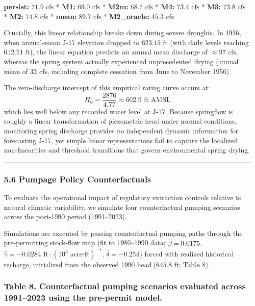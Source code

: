 \documentclass[11pt]{article}
\begin{document}
\textbf{persist:} \(71.9\text{ cfs}\) * \textbf{M1:} \(69.0\text{ cfs}\)
* \textbf{M2m:} \(68.7\text{ cfs}\) * \textbf{M4:} \(73.4\text{ cfs}\) *
\textbf{M3:} \(73.8\text{ cfs}\) * \textbf{M2:} \(74.8\text{ cfs}\) *
\textbf{mean:} \(89.7\text{ cfs}\) * \textbf{M2\_oracle:}
\(45.3\text{ cfs}\)

Crucially, this linear relationship breaks down during severe droughts.
In 1956, when annual-mean J-17 elevation dropped to \(623.15\text{ ft}\)
(with daily levels reaching \(612.51\text{ ft}\)), the linear equation
predicts an annual mean discharge of \(\approx 97\text{ cfs}\), whereas
the spring system actually experienced unprecedented drying (annual mean
of \(32\text{ cfs}\), including complete cessation from June to November
1956).

The zero-discharge intercept of this empirical rating curve occurs at:
\[H_0 = \frac{2876}{4.77} \approx 602.9\text{ ft AMSL}\] which lies well
below any recorded water level at J-17. Because springflow is roughly a
linear transformation of piezometric head under normal conditions,
monitoring spring discharge provides no independent dynamic information
for forecasting J-17, yet simple linear representations fail to capture
the localized non-linearities and threshold transitions that govern
environmental spring drying.

\begin{center}\rule{0.5\linewidth}{0.5pt}\end{center}

\subsubsection{5.6 Pumpage Policy
Counterfactuals}\label{pumpage-policy-counterfactuals}

To evaluate the operational impact of regulatory extraction controls
relative to natural climatic variability, we simulate four
counterfactual pumping scenarios across the post-1990 period
(1991--2023).

Simulations are executed by passing counterfactual pumping paths through
the pre-permitting stock-flow map (fit to 1980--1990 data;
\(\hat{\beta} = 0.0175\),
\(\hat{\gamma} = -0.0284\text{ ft}\cdot(10^3\text{ acre-ft})^{-1}\),
\(\hat{\delta} = -0.254\)) forced with realized historical recharge,
initialized from the observed 1990 head (\(645.8\text{ ft}\); Table 8).

\subsubsection{Table 8. Counterfactual pumping scenarios evaluated
across 1991--2023 using the pre-permit
model.}\label{table-8.-counterfactual-pumping-scenarios-evaluated-across-19912023-using-the-pre-permit-model.}
\end{document}
